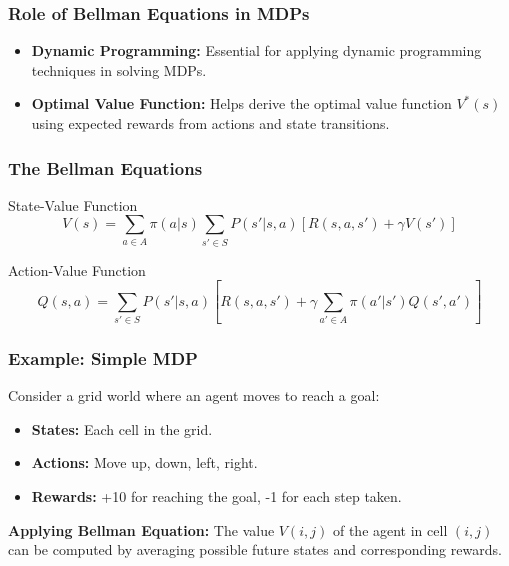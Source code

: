 \documentclass[aspectratio=169]{beamer}
\begin{document}
\begin{frame}[fragile]
    \frametitle{Role of Bellman Equations in MDPs}
    \begin{itemize}
        \item \textbf{Dynamic Programming:} Essential for applying dynamic programming techniques in solving MDPs.
        \item \textbf{Optimal Value Function:} Helps derive the optimal value function $V^*(s)$ using expected rewards from actions and state transitions.
    \end{itemize}
\end{frame}

\begin{frame}[fragile]
    \frametitle{The Bellman Equations}

    \begin{block}{State-Value Function}
    \begin{equation}
    V(s) = \sum_{a \in A} \pi(a|s) \sum_{s' \in S} P(s'|s,a) \left[R(s,a,s') + \gamma V(s')\right]
    \end{equation}
    \end{block}
    
    \begin{block}{Action-Value Function}
    \begin{equation}
    Q(s,a) = \sum_{s' \in S} P(s'|s,a) \left[R(s,a,s') + \gamma \sum_{a' \in A} \pi(a'|s') Q(s',a')\right]
    \end{equation}
    \end{block}
\end{frame}

\begin{frame}[fragile]
    \frametitle{Example: Simple MDP}
    Consider a grid world where an agent moves to reach a goal:
    \begin{itemize}
        \item \textbf{States:} Each cell in the grid.
        \item \textbf{Actions:} Move up, down, left, right.
        \item \textbf{Rewards:} +10 for reaching the goal, -1 for each step taken.
    \end{itemize}
    
    \textbf{Applying Bellman Equation:} The value $V(i,j)$ of the agent in cell $(i,j)$ can be computed by averaging possible future states and corresponding rewards.
\end{frame}
\end{document}
